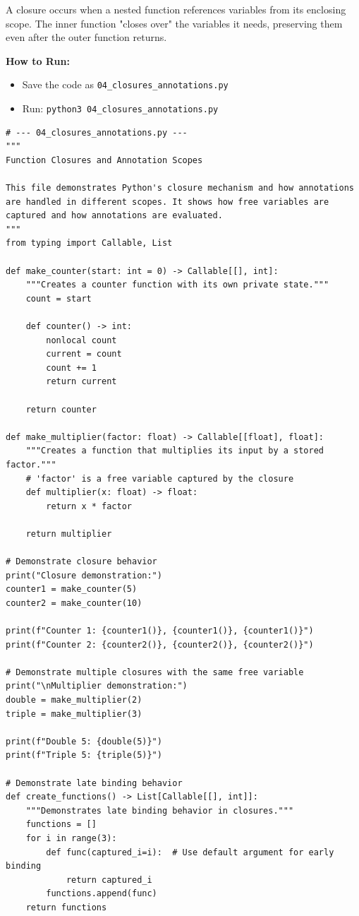 \documentclass[12pt,letterpaper]{article}
\newenvironment{macterminal}{%
    \begin{mdframed}[
        linecolor=terminalFrame,
        backgroundcolor=terminalBg,
        roundcorner=5pt,
        skipabove=5pt,
        skipbelow=5pt,
        linewidth=1pt,
        innertopmargin=5pt,
        frametitle={%
            \tikz[baseline=(current bounding box.east), outer sep=0pt]{
                \fill[red!80!black] (0,0) circle (5pt);
                \fill[yellow!80!black] (0.7,0) circle (5pt);
                \fill[green!70!black] (1.4,0) circle (5pt);
            }
        },
        frametitlealignment=\raggedright,
        frametitleaboveskip=8pt,
        frametitlebelowskip=0pt,
    ]
}{%
    \end{mdframed}%
}
\begin{document}
A closure occurs when a nested function references variables from its enclosing scope. The inner function "closes over" the variables it needs, preserving them even after the outer function returns.

\textbf{How to Run:}
\begin{itemize}
    \item Save the code as \verb|04_closures_annotations.py|
    \item Run: \verb|python3 04_closures_annotations.py|
\end{itemize}

\begin{macterminal}
\begin{lstlisting}
# --- 04_closures_annotations.py ---
"""
Function Closures and Annotation Scopes

This file demonstrates Python's closure mechanism and how annotations
are handled in different scopes. It shows how free variables are
captured and how annotations are evaluated.
"""
from typing import Callable, List

def make_counter(start: int = 0) -> Callable[[], int]:
    """Creates a counter function with its own private state."""
    count = start
    
    def counter() -> int:
        nonlocal count
        current = count
        count += 1
        return current
    
    return counter

def make_multiplier(factor: float) -> Callable[[float], float]:
    """Creates a function that multiplies its input by a stored factor."""
    # 'factor' is a free variable captured by the closure
    def multiplier(x: float) -> float:
        return x * factor
    
    return multiplier

# Demonstrate closure behavior
print("Closure demonstration:")
counter1 = make_counter(5)
counter2 = make_counter(10)

print(f"Counter 1: {counter1()}, {counter1()}, {counter1()}")
print(f"Counter 2: {counter2()}, {counter2()}, {counter2()}")

# Demonstrate multiple closures with the same free variable
print("\nMultiplier demonstration:")
double = make_multiplier(2)
triple = make_multiplier(3)

print(f"Double 5: {double(5)}")
print(f"Triple 5: {triple(5)}")

# Demonstrate late binding behavior
def create_functions() -> List[Callable[[], int]]:
    """Demonstrates late binding behavior in closures."""
    functions = []
    for i in range(3):
        def func(captured_i=i):  # Use default argument for early binding
            return captured_i
        functions.append(func)
    return functions


\end{lstlisting}
\end{macterminal}
\end{document}
